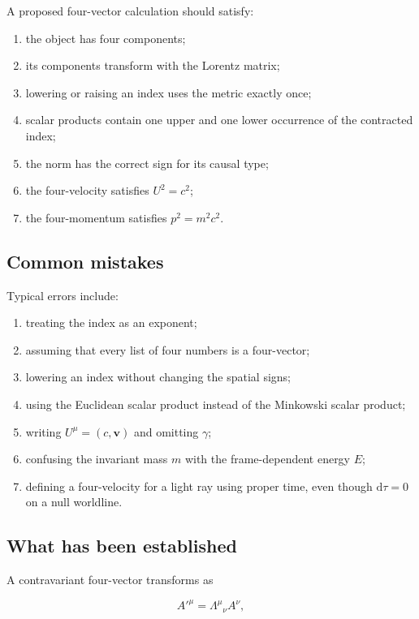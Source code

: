 A proposed four-vector calculation should satisfy:

\begin{enumerate}
    \item the object has four components;
    \item its components transform with the Lorentz matrix;
    \item lowering or raising an index uses the metric exactly once;
    \item scalar products contain one upper and one lower occurrence of the contracted index;
    \item the norm has the correct sign for its causal type;
    \item the four-velocity satisfies \(U^{2}=c^{2}\);
    \item the four-momentum satisfies \(p^{2}=m^{2}c^{2}\).
\end{enumerate}

\subsection{Common mistakes}

Typical errors include:

\begin{enumerate}
    \item treating the index as an exponent;
    \item assuming that every list of four numbers is a four-vector;
    \item lowering an index without changing the spatial signs;
    \item using the Euclidean scalar product instead of the Minkowski scalar product;
    \item writing \(U^{\mu}=(c,\mathbf{v})\) and omitting \(\gamma\);
    \item confusing the invariant mass \(m\) with the frame-dependent energy \(E\);
    \item defining a four-velocity for a light ray using proper time, even though \(\mathrm{d}\tau=0\) on a null worldline.
\end{enumerate}

\subsection{What has been established}

A contravariant four-vector transforms as

\[
A'^{\mu}
=
\Lambda^{\mu}{}_{\nu}A^{\nu},
\]

